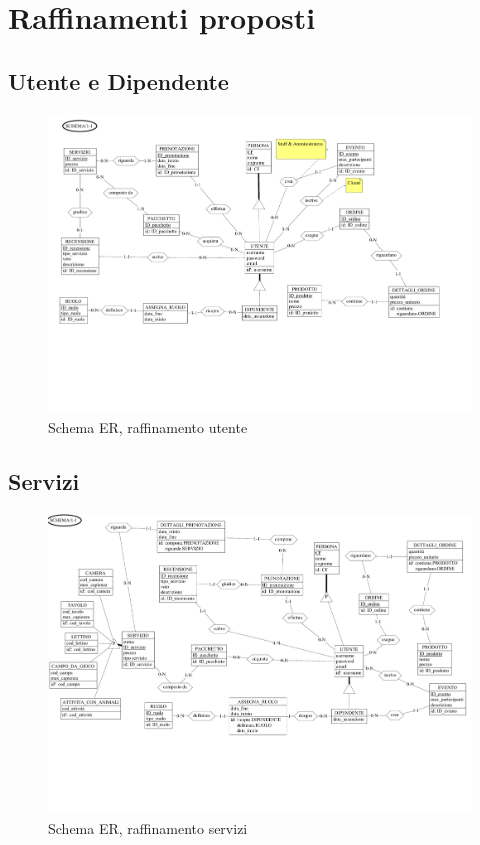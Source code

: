 \documentclass[a4paper,11pt]{report}
\begin{document}
\section{Raffinamenti proposti}
\subsection{Utente e Dipendente}
\begin{figure}[H]
	\centering
	\includegraphics[width=\textwidth, trim=0 150pt 0 0, clip]{./pdf/raffinamento ruolo.pdf}
	\caption{Schema ER, raffinamento utente}
	\label{fig:raffinamento-utente}
\end{figure}

\subsection{Servizi}
\begin{figure}[H]
	\centering
	\includegraphics[width=\textwidth, trim=0 150pt 0 0, clip]{./pdf/raffinamento servizi.pdf}
	\caption{Schema ER, raffinamento servizi}
	\label{fig:raffinamento-servizi}
\end{figure}
\end{document}
